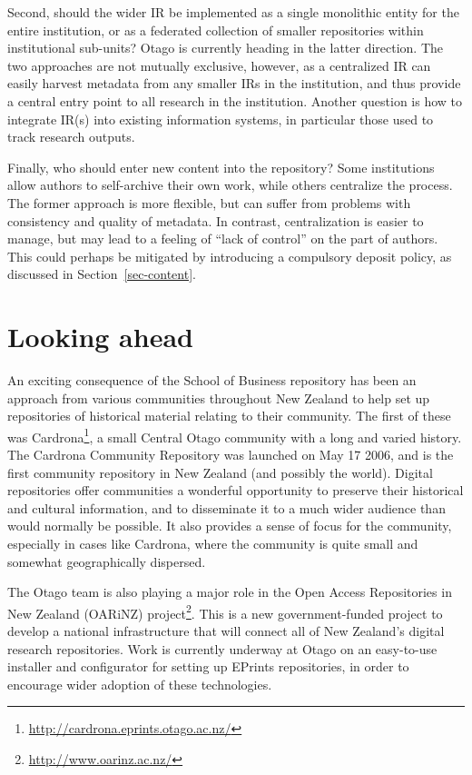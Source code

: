 \documentclass[12pt,pdftex,a4paper,titlepage]{article}
\begin{document}
Second, should the wider IR be implemented as a single monolithic entity for the entire institution, or as a federated collection of smaller repositories within institutional sub-units? Otago is currently heading in the latter direction. The two approaches are not mutually exclusive, however, as a centralized IR can easily harvest metadata from any smaller IRs in the institution, and thus provide a central entry point to all research in the institution. Another question is how to integrate IR(s) into existing information systems, in particular those used to track research outputs.

Finally, who should enter new content into the repository? Some institutions allow authors to self-archive their own work, while others centralize the process. The former approach is more flexible, but can suffer from problems with consistency and quality of metadata. In contrast, centralization is easier to manage, but may lead to a feeling of ``lack of control'' on the part of authors. This could perhaps be mitigated by introducing a compulsory deposit policy, as discussed in Section~\ref{sec-content}.


\section{Looking ahead}

An exciting consequence of the School of Business repository has been an approach from various communities throughout New Zealand to help set up repositories of historical material relating to their community. The first of these was Cardrona\footnote{\url{http://cardrona.eprints.otago.ac.nz/}}, a small Central Otago community with a long and varied history. The Cardrona Community Repository was launched on May 17 2006, and is the first community repository in New Zealand (and possibly the world). Digital repositories offer communities a wonderful opportunity to preserve their historical and cultural information, and to disseminate it to a much wider audience than would normally be possible. It also provides a sense of focus for the community, especially in cases like Cardrona, where the community is quite small and somewhat geographically dispersed.

The Otago team is also playing a major role in the Open Access Repositories in New Zealand (OARiNZ) project\footnote{\url{http://www.oarinz.ac.nz/}}. This is a new government-funded project to develop a national infrastructure that will connect all of New Zealand's digital research repositories. Work is currently underway at Otago on an easy-to-use installer and configurator for setting up EPrints repositories, in order to encourage wider adoption of these technologies.
\end{document}
